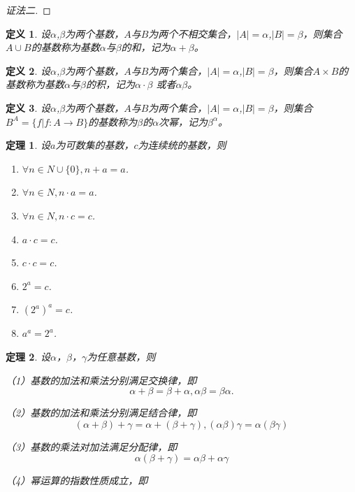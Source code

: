 \documentclass{article}
\newtheorem{Def}{定义}
\newtheorem{Thm}{定理}
\begin{document}
\begin{CJK*}{UTF8}{gbsn}
\begin{proof}[证法二]
  \end{proof}

    \begin{Def}
    设$\alpha$,$\beta$为两个基数，$A$与$B$为两个不相交集合，$|A|=\alpha$,$|B|=\beta$，则集合$A\cup B$的基数称为基数$\alpha$与$\beta$的和，记为$\alpha + \beta$。
  \end{Def}
  \begin{Def}
    设$\alpha$,$\beta$为两个基数，$A$与$B$为两个集合，$|A|=\alpha$,$|B|=\beta$，则集合$A\times B$的基数称为基数$\alpha$与$\beta$的积，记为$\alpha \cdot \beta$ 或者$\alpha \beta$。
  \end{Def}
  \begin{Def}
    设$\alpha$,$\beta$为两个基数，$A$与$B$为两个集合，$|A|=\alpha$,$|B|=\beta$，则集合$B^A=\{f|f:A\to B\}$的基数称为$\beta$的$\alpha$次幂，记为$\beta^{\alpha}$。
  \end{Def}  

    \begin{Thm}
  设$a$为可数集的基数，$c$为连续统的基数，则
  \begin{enumerate}
  \item $\forall n\in N\cup \{0\}, n + a = a$.
  \item $\forall n\in N, n \cdot a = a$.
  \item $\forall n\in N, n \cdot c = c$.
  \item $a\cdot c =c$.
  \item $c\cdot c = c$.
  \item $2^a=c$.
  \item $(2^a)^a=c$.
  \item $a^a=2^a$.
  \end{enumerate}    
  \end{Thm}
\begin{Thm}
  设$\alpha$，$\beta$，$\gamma$为任意基数，则

  （1）基数的加法和乘法分别满足交换律，即
  \[\alpha + \beta = \beta + \alpha, \alpha \beta = \beta \alpha.\]

  （2）基数的加法和乘法分别满足结合律，即
  \[(\alpha + \beta)+\gamma = \alpha + (\beta + \gamma), (\alpha\beta)\gamma = \alpha(\beta\gamma)\]

  （3）基数的乘法对加法满足分配律，即
\[\alpha(\beta + \gamma) = \alpha \beta + \alpha \gamma\]

  （4）幂运算的指数性质成立，即


\end{Thm}
\end{CJK*}
\end{document}
